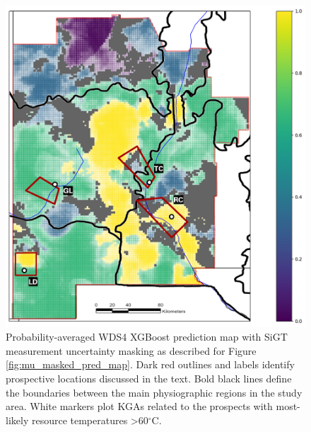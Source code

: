 \begin{figure}
\centering
\includegraphics[width=.75\textwidth]{templates/images/Figure-MU_Masked_Average_Gradient_Map_Prospect_Zones.png}
\caption[Measurement uncertainty map with prospective areas]
{Probability-averaged WDS4 XGBoost prediction map with SiGT measurement uncertainty masking as described for Figure \ref{fig:mu_masked_pred_map}. Dark red outlines and labels identify prospective locations discussed in the text. Bold black lines define the boundaries between the main physiographic regions in the study area. White markers plot KGAs related to the prospects with most-likely resource temperatures >60$^\circ$C.}
\label{fig:measure_uncertainty_prospects}
\end{figure}

